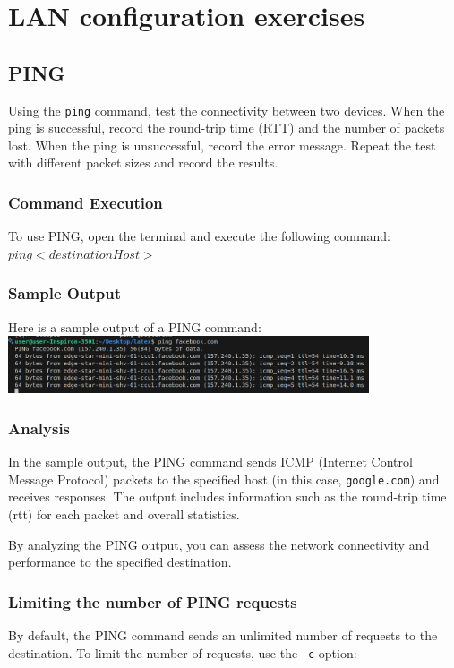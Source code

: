 \documentclass[12pt]{article}
\begin{document}
\section*{LAN configuration exercises}

\subsection{PING}
Using the {
    \texttt{ping}
} command, test the connectivity between two devices. When the ping is successful, record the round-trip time (RTT) and the number of packets lost. When the ping is unsuccessful, record the error message. Repeat the test with different packet sizes and record the results.
    


\subsubsection*{Command Execution}
To use PING, open the terminal and execute the following command:
$ping <destinationHost>$



\subsubsection*{Sample Output}
Here is a sample output of a PING command:
\includegraphics[width=0.8\textwidth]{ping.png}\par\vspace{1cm}


\subsubsection*{Analysis}
In the sample output, the PING command sends ICMP (Internet Control Message Protocol) packets to the specified host (in this case, \texttt{google.com}) and receives responses. The output includes information such as the round-trip time (rtt) for each packet and overall statistics.

By analyzing the PING output, you can assess the network connectivity and performance to the specified destination.
 

\subsubsection*{Limiting the number of PING requests}
By default, the PING command sends an unlimited number of requests to the destination. To limit the number of requests, use the \texttt{-c} option:
\end{document}

